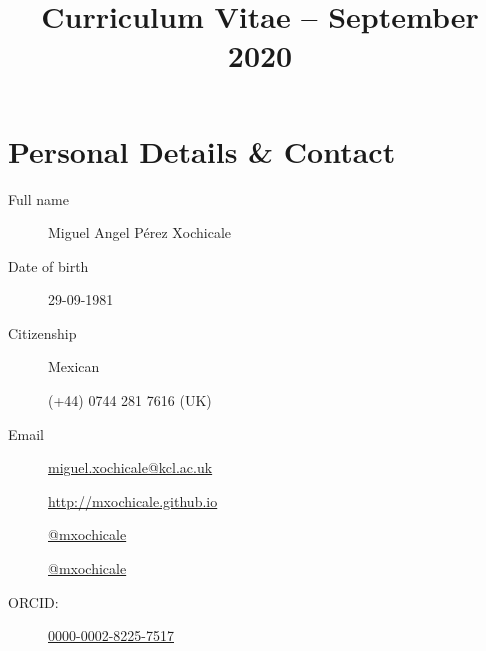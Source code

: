 \documentclass[10pt,a4paper,roman]{moderncv}
\title{Curriculum Vitae -- September 2020}
\begin{document}
%
%
\makecvtitle



%


\vspace{-10mm}


\section{Personal Details \& Contact}
%

\begin{changemargin}{2.4cm}{0.5cm}
  \begin{minipage}{.4\textwidth}
    \begin{description}
	\item[Full name] Miguel Angel P\'erez Xochicale
     	\item[Date of birth] 29-09-1981
	\item[Citizenship] Mexican 
	\item[\faMobile ]  (+44) 0744 281 7616 (UK)
	\item[Email]  
		\href{miguel.xochicale@kcl.ac.uk}
			{miguel.xochicale@kcl.ac.uk}

     \end{description}
  \end{minipage}
  \begin{minipage}{.4\textwidth}
  \begin{description}
     	\item[\faHome]  \href{http://mxochicale.github.io}{http://mxochicale.github.io}
	\item[\faTwitter ] \href{https://twitter.com/_mxochicale}{@\textunderscore mxochicale}
	\item[\faGithub]  \href{https://github.com/mxochicale}{@mxochicale}
	\item[ORCID:] \href{http://orcid.org/0000-0002-8225-7517}{0000-0002-8225-7517}
   \end{description}
  \end{minipage}
\end{changemargin}
\end{document}
